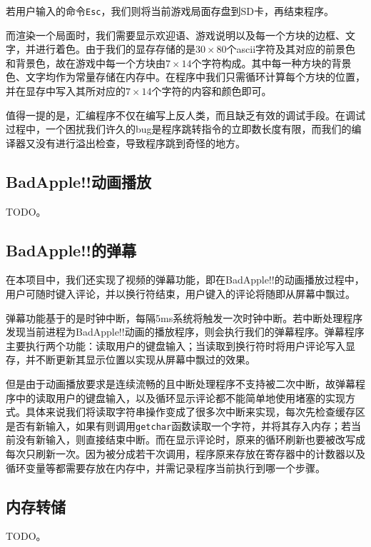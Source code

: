 \documentclass[11pt,utf8]{report}
\begin{document}
若用户输入的命令\texttt{Esc}，我们则将当前游戏局面存盘到SD卡，再结束程序。

而渲染一个局面时，我们需要显示欢迎语、游戏说明以及每一个方块的边框、文字，并进行着色。由于我们的显存存储的是$30\times80$个ascii字符及其对应的前景色和背景色，故在游戏中每一个方块由$7\times14$个字符构成。其中每一种方块的背景色、文字均作为常量存储在内存中。在程序中我们只需循环计算每个方块的位置，并在显存中写入其所对应的$7\times14$个字符的内容和颜色即可。

值得一提的是，汇编程序不仅在编写上反人类，而且缺乏有效的调试手段。在调试过程中，一个困扰我们许久的bug是程序跳转指令的立即数长度有限，而我们的编译器又没有进行溢出检查，导致程序跳到奇怪的地方。


\subsection{BadApple!!动画播放} 
	\par TODO。

\subsection{BadApple!!的弹幕}

在本项目中，我们还实现了视频的弹幕功能，即在BadApple!!的动画播放过程中，用户可随时键入评论，并以换行符结束，用户键入的评论将随即从屏幕中飘过。

弹幕功能基于的是时钟中断，每隔5ms系统将触发一次时钟中断。若中断处理程序发现当前进程为BadApple!!动画的播放程序，则会执行我们的弹幕程序。弹幕程序主要执行两个功能：读取用户的键盘输入；当读取到换行符时将用户评论写入显存，并不断更新其显示位置以实现从屏幕中飘过的效果。

但是由于动画播放要求是连续流畅的且中断处理程序不支持被二次中断，故弹幕程序中的读取用户的键盘输入，以及循环显示评论都不能简单地使用堵塞的实现方式。具体来说我们将读取字符串操作变成了很多次中断来实现，每次先检查缓存区是否有新输入，如果有则调用\texttt{getchar}函数读取一个字符，并将其存入内存；若当前没有新输入，则直接结束中断。而在显示评论时，原来的循环刷新也要被改写成每次只刷新一次。因为被分成若干次调用，程序原来存放在寄存器中的计数器以及循环变量等都需要存放在内存中，并需记录程序当前执行到哪一个步骤。



\subsection{内存转储}
	\par TODO。
\end{document}
